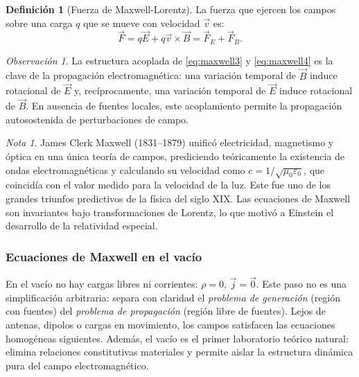 \documentclass[12pt, a4paper]{article}
\theoremstyle{plain}
\theoremstyle{definition}
\newtheorem{definicion}[teorema]{Definición}
\theoremstyle{remark}
\newtheorem*{nota}{Nota}
\newtheorem*{observacion}{Observación}
\newcommand{\ve}[1]{\vec{#1}}
\begin{document}
\begin{definicion}[Fuerza de Maxwell-Lorentz]
La fuerza que ejercen los campos sobre una carga $q$ que se mueve con
velocidad $\ve{v}$ es:
\begin{equation}
  \ve{F} = q\ve{E} + q\ve{v}\times\ve{B} = \ve{F}_E + \ve{F}_B.
  \label{eq:lorentz}
\end{equation}
\end{definicion}

\begin{observacion}
La estructura acoplada de \eqref{eq:maxwell3} y \eqref{eq:maxwell4} es la clave
de la propagación electromagnética: una variación temporal de $\ve{B}$ induce
rotacional de $\ve{E}$ y, recíprocamente, una variación temporal de $\ve{E}$
induce rotacional de $\ve{B}$. En ausencia de fuentes locales, este acoplamiento
permite la propagación autosostenida de perturbaciones de campo.
\end{observacion}

\begin{nota}
James Clerk Maxwell (1831--1879) unificó electricidad, magnetismo y óptica
en una única teoría de campos, prediciendo teóricamente la existencia de ondas
electromagnéticas y calculando su velocidad como $c = 1/\sqrt{\mu_0\varepsilon_0}$,
que coincidía con el valor medido para la velocidad de la luz. Este fue uno de
los grandes triunfos predictivos de la física del siglo XIX. Las ecuaciones de
Maxwell son invariantes bajo transformaciones de Lorentz, lo que motivó a
Einstein el desarrollo de la relatividad especial.
\end{nota}

\subsubsection{Ecuaciones de Maxwell en el vacío}

En el vacío no hay cargas libres ni corrientes: $\rho=0$, $\ve{j}=\ve{0}$.
Este paso no es una simplificación arbitraria: separa con claridad el
\emph{problema de generación} (región con fuentes) del \emph{problema de
propagación} (región libre de fuentes). Lejos de antenas, dipolos o cargas en
movimiento, los campos satisfacen las ecuaciones homogéneas siguientes.
Además, el vacío es el primer laboratorio teórico natural: elimina relaciones
constitutivas materiales y permite aislar la estructura dinámica pura del
campo electromagnético.
\end{document}
